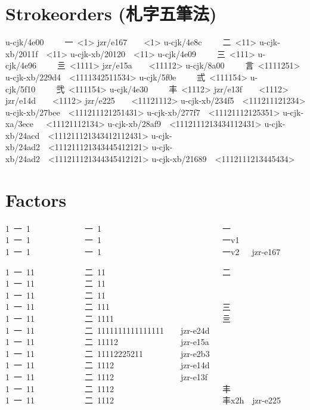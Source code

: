 \section{Strokeorders ({\cjk{}札字五筆法})
}
\begin{multicols}{2}\begingroup\mktsStyleCode{}\begingroup\mktsObeyAllLines{}u-cjk/4e00     {\cjk{}一} <1>
jzr/e167   { }<1>
u-cjk/4e8c     {\cjk{}二} <11>
u-cjk-xb/2011f { }<11>
u-cjk-xb/20120 { }<11>
u-cjk/4e09     {\cjk{}三} <111>
u-cjk/4e96     {\cjk{}亖} <1111>
jzr/e15a   { }<11112>
u-cjk/8a00     {\cjk{}言} <1111251>
u-cjk-xb/229d4 { }<1111342511534>
u-cjk/5f0e     {\cjk{}弎} <111154>
u-cjk/5f10     {\cjk{}弐} <111154>
u-cjk/4e30     {\cjk{}丰} <1112>
jzr/e13f   { }<1112>
jzr/e14d   { }<1112>
jzr/e225   { }<11121112>
u-cjk-xb/234f5 { }<111211121234>
u-cjk-xb/27bee { }<111211121251431>
u-cjk-xb/277f7 { }<11121112125351>
u-cjk-xa/3ece  { }<11121112134>
u-cjk-xb/28af9 { }<1112111213434112431>
u-cjk-xb/24acd { }<111211121343412112431>
u-cjk-xb/24ad2 { }<111211121343445412121>
u-cjk-xb/24ad2 { }<111211121344345412121>
u-cjk-xb/21689 { }<1112111213445434>
\endgroup{}\endgroup{}\end{multicols}
\section{Factors
}
\begin{multicols}{2}\end{multicols}\begingroup\mktsStyleCode{}\begingroup\mktsObeyAllLines{}1 {\cjk{}一} 1             {\cjk{}一} 1                             {\cjk{}一} 
1 {\cjk{}一} 1             {\cjk{}一} 1                             {\cjk{}一}v1             {} 
1 {\cjk{}一} 1             {\cjk{}一} 1                             {\cjk{}一}v2   jzr-e167  {} 
 
1 {\cjk{}一} 11            {\cjk{}二} 11                            {\cjk{}二} 
1 {\cjk{}一} 11            {\cjk{}二} 11                            {} 
1 {\cjk{}一} 11            {\cjk{}二} 11                            {} 
1 {\cjk{}一} 11            {\cjk{}二} 111                           {\cjk{}三} 
1 {\cjk{}一} 11            {\cjk{}二} 1111                          {\cjk{}亖} 
1 {\cjk{}一} 11            {\cjk{}二} 1111111111111111    jzr-e24d  {} 
1 {\cjk{}一} 11            {\cjk{}二} 11112               jzr-e15a  {} 
1 {\cjk{}一} 11            {\cjk{}二} 11112225211         jzr-e2b3  {} 
1 {\cjk{}一} 11            {\cjk{}二} 1112                jzr-e14d  {} 
1 {\cjk{}一} 11            {\cjk{}二} 1112                jzr-e13f  {} 
1 {\cjk{}一} 11            {\cjk{}二} 1112                          {\cjk{}丰} 
1 {\cjk{}一} 11            {\cjk{}二} 1112                          {\cjk{}丰}x2h  jzr-e225  {} 
 
